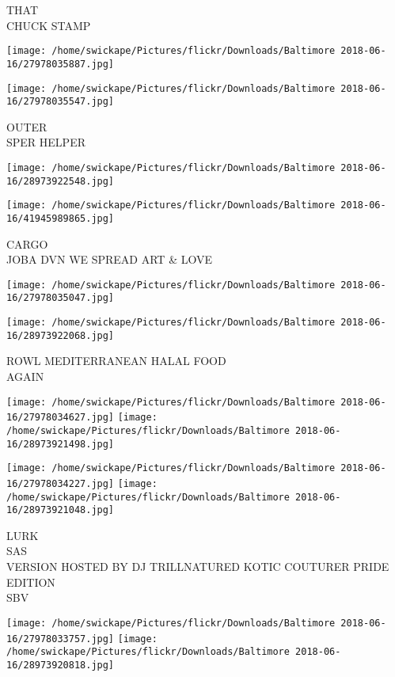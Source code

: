 \documentclass[10pt,letterpaper]{article}
\begin{document}
THAT\\
CHUCK STAMP
\pagebreak

\texttt{[image: /home/swickape/Pictures/flickr/Downloads/Baltimore 2018-06-16/27978035887.jpg]}

\vspace{0.25in}
\texttt{[image: /home/swickape/Pictures/flickr/Downloads/Baltimore 2018-06-16/27978035547.jpg]}

OUTER\\
SPER HELPER
\pagebreak

\texttt{[image: /home/swickape/Pictures/flickr/Downloads/Baltimore 2018-06-16/28973922548.jpg]}

\vspace{0.25in}
\texttt{[image: /home/swickape/Pictures/flickr/Downloads/Baltimore 2018-06-16/41945989865.jpg]}

CARGO\\
JOBA DVN WE SPREAD ART \& LOVE
\pagebreak

\texttt{[image: /home/swickape/Pictures/flickr/Downloads/Baltimore 2018-06-16/27978035047.jpg]}

\vspace{0.25in}
\texttt{[image: /home/swickape/Pictures/flickr/Downloads/Baltimore 2018-06-16/28973922068.jpg]}

ROWL MEDITERRANEAN HALAL FOOD\\
AGAIN
\pagebreak

\texttt{[image: /home/swickape/Pictures/flickr/Downloads/Baltimore 2018-06-16/27978034627.jpg]}
\texttt{[image: /home/swickape/Pictures/flickr/Downloads/Baltimore 2018-06-16/28973921498.jpg]}

\texttt{[image: /home/swickape/Pictures/flickr/Downloads/Baltimore 2018-06-16/27978034227.jpg]}
\texttt{[image: /home/swickape/Pictures/flickr/Downloads/Baltimore 2018-06-16/28973921048.jpg]}

LURK\\
SAS\\
VERSION HOSTED BY DJ TRILLNATURED KOTIC COUTURER PRIDE EDITION\\
SBV
\pagebreak

\texttt{[image: /home/swickape/Pictures/flickr/Downloads/Baltimore 2018-06-16/27978033757.jpg]}
\texttt{[image: /home/swickape/Pictures/flickr/Downloads/Baltimore 2018-06-16/28973920818.jpg]}
\end{document}
